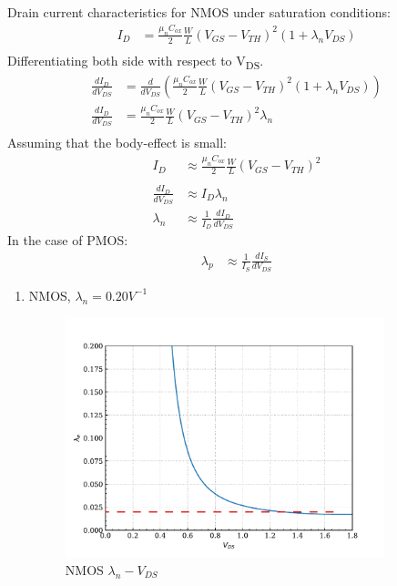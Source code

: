 \documentclass{article}
\begin{document}
\begin{enumerate}[(a)]
Drain current characteristics for NMOS under saturation conditions:
\begin{equation*}
\begin{aligned}
I_{D} &= \frac{\mu_{n}C_{ox}}{2} \frac{W}{L} (V_{GS} - V_{TH})^2(1 + \lambda_{n}V_{DS}) \\
\end{aligned}
\end{equation*}
Differentiating both side with respect to V\textsubscript{DS}.
\begin{equation*}
\begin{aligned}
\frac{dI_{D}}{dV_{DS}} &= \frac{d}{dV_{DS}} (\frac{\mu_{n}C_{ox}}{2} \frac{W}{L} (V_{GS} - V_{TH})^2(1 + \lambda_{n} V_{DS})) \\
\frac{dI_{D}}{dV_{DS}} &= \frac{\mu_{n}C_{ox}}{2} \frac{W}{L} (V_{GS} - V_{TH})^2 \lambda_{n} \\
\end{aligned}
\end{equation*}
Assuming that the body-effect is small:
\begin{equation*}
\begin{aligned}
I_{D} &\approx \frac{\mu_{n}C_{ox}}{2} \frac{W}{L} (V_{GS} - V_{TH})^2 \\
\\
\frac{dI_{D}}{dV_{DS}} &\approx I_{D} \lambda_{n} \\
\lambda_{n} &\approx \frac{1}{I_{D}} \frac{dI_{D}}{dV_{DS}}
\end{aligned}
\end{equation*}
In the case of PMOS:
\begin{equation*}
\begin{aligned}
\lambda_{p} &\approx \frac{1}{I_{S}} \frac{dI_{S}}{dV_{DS}}
\end{aligned}
\end{equation*}

\begin{enumerate}[1.]
\item NMOS, \(\lambda_{n} = 0.20 V^{-1}\)
\begin{figure}[H]
\centering
\includegraphics[width=350px]{img/q4/b/nmos-d-id-id.pdf}
\caption{\label{fig:nmos-d-id-id}NMOS \(\lambda_{n}-V_{DS}\)}
\end{figure}


\end{enumerate}
\end{enumerate}
\end{document}
